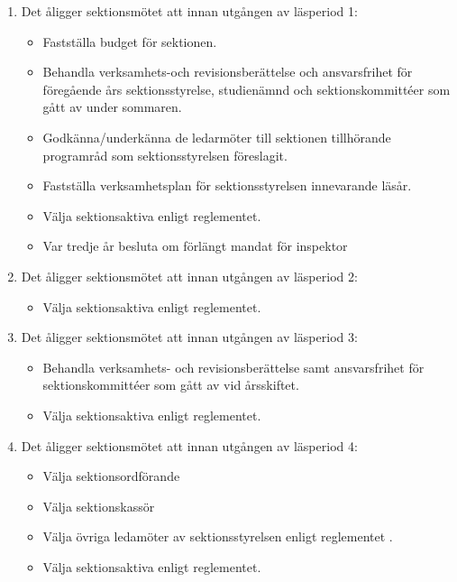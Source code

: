 \documentclass[11pt,a4paper]{article}
\begin{document}
\begin{enumerate}[\thesubsection .1]

  \item Det åligger sektionsmötet att innan utgången av läsperiod 1:
    \begin{itemize}
      \item Fastställa budget för sektionen.
      \item Behandla verksamhets-och revisionsberättelse och ansvarsfrihet för
      före\-gående års sektionsstyrelse, studienämnd och sektionskommittéer som gått av under sommaren.
      \item Godkänna/underkänna de ledarmöter till sektionen tillhörande programråd som sektionsstyrelsen föreslagit.
      \item Fastställa verksamhetsplan för sektionsstyrelsen innevarande läsår.
      \item Välja sektionsaktiva enligt reglementet. 
      
      
      \item Var tredje år besluta om förlängt mandat för inspektor
    \end{itemize}

  \item Det åligger sektionsmötet att innan utgången av läsperiod 2:
    \begin{itemize}
      \item Välja sektionsaktiva enligt reglementet.
    \end{itemize}

  \item Det åligger sektionsmötet att innan utgången av läsperiod 3:
    \begin{itemize}
      \item Behandla verksamhets- och revisionsberättelse samt ansvarsfrihet
      för sektionskommittéer som gått av vid årsskiftet.
      \item Välja sektionsaktiva enligt reglementet.
    \end{itemize}

  \item Det åligger sektionsmötet att innan utgången av läsperiod 4:
    \begin{itemize}
    \item Välja sektionsordförande
    \item Välja sektionskassör
      \item Välja övriga ledamöter av sektionsstyrelsen  enligt reglementet .
      \item Välja sektionsaktiva enligt reglementet.
    \end{itemize}

\end{enumerate}
\end{document}
